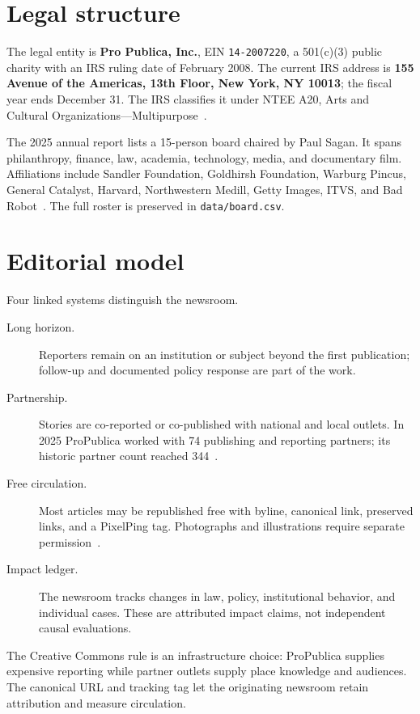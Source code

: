 \documentclass[10pt,letterpaper,twocolumn]{article}
\begin{document}
\section{Legal structure}

The legal entity is \textbf{Pro Publica, Inc.}, EIN \texttt{14-2007220}, a 501(c)(3) public charity with an IRS ruling date of February 2008. The current IRS address is \textbf{155 Avenue of the Americas, 13th Floor, New York, NY 10013}; the fiscal year ends December 31. The IRS classifies it under NTEE A20, Arts and Cultural Organizations---Multipurpose~\citep{pp990}.

The 2025 annual report lists a 15-person board chaired by Paul Sagan. It spans philanthropy, finance, law, academia, technology, media, and documentary film. Affiliations include Sandler Foundation, Goldhirsh Foundation, Warburg Pincus, General Catalyst, Harvard, Northwestern Medill, Getty Images, ITVS, and Bad Robot~\citep{pp2025,ppleadership}. The full roster is preserved in \texttt{data/board.csv}.

\section{Editorial model}

Four linked systems distinguish the newsroom.

\begin{description}
\item[Long horizon.] Reporters remain on an institution or subject beyond the first publication; follow-up and documented policy response are part of the work.
\item[Partnership.] Stories are co-reported or co-published with national and local outlets. In 2025 ProPublica worked with 74 publishing and reporting partners; its historic partner count reached 344~\citep{pp2025}.
\item[Free circulation.] Most articles may be republished free with byline, canonical link, preserved links, and a PixelPing tag. Photographs and illustrations require separate permission~\citep{pprepublish}.
\item[Impact ledger.] The newsroom tracks changes in law, policy, institutional behavior, and individual cases. These are attributed impact claims, not independent causal evaluations.
\end{description}

The Creative Commons rule is an infrastructure choice: ProPublica supplies expensive reporting while partner outlets supply place knowledge and audiences. The canonical URL and tracking tag let the originating newsroom retain attribution and measure circulation.
\end{document}
